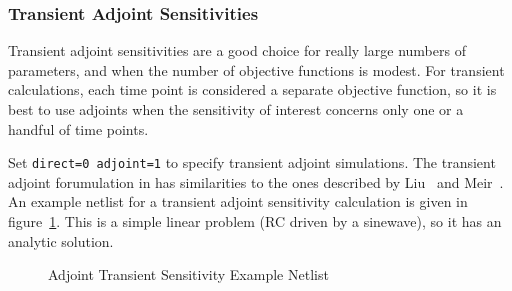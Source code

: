 \clearpage
\subsubsection{Transient Adjoint Sensitivities}
Transient adjoint sensitivities are a good choice for really large
numbers of parameters, and when the number of objective functions is
modest.  For transient calculations, each time point is considered a
separate objective function, so it is best to use adjoints when the
sensitivity of interest concerns only one or a handful of time points.

Set \texttt{direct=0 adjoint=1} to specify transient adjoint
simulations.  The transient adjoint forumulation in \Xyce{} has
similarities to the ones described by Liu~\cite{Liu2014} and
Meir~\cite{BLAST2012}.  An example netlist for a transient adjoint
sensitivity calculation is given in
figure~\ref{Tran_Adjoint_Sensitivity_Netlist}.  This is a simple
linear problem (RC driven by a sinewave), so it has an analytic
solution.
\begin{figure}[htbp]
  \begin{centering}
\caption[Adjoint Transient Sensitivity Example Netlist]
{Adjoint Transient Sensitivity Example Netlist \label{Tran_Adjoint_Sensitivity_Netlist} }
\end{centering}
\end{figure}
